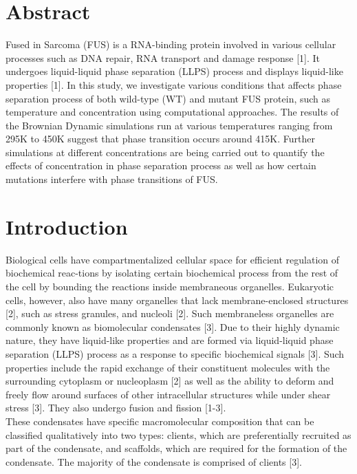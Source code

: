 \documentclass[12ptr]{article}
\begin{document}
\section{Abstract}
Fused in Sarcoma (FUS) is a RNA-binding protein involved in various cellular processes such as DNA repair, RNA transport and damage response [1]. It undergoes liquid-liquid phase separation (LLPS) process and displays liquid-like properties [1]. In this study, we investigate various conditions that affects phase separation process of both wild-type (WT) and mutant FUS protein, such as temperature and concentration using computational approaches. The results of the Brownian Dynamic simulations run at various temperatures ranging from 295K to 450K suggest that phase transition occurs around 415K. Further simulations at different concentrations are being carried out to quantify the effects of concentration in phase separation process as well as how certain mutations interfere with phase transitions of FUS. 

\section{Introduction}

Biological cells have compartmentalized cellular space for efficient regulation of biochemical reac-tions by isolating certain biochemical process from the rest of the cell by bounding the reactions inside membraneous organelles. Eukaryotic cells, however, also have many organelles that lack membrane-enclosed structures [2], such as stress granules, and nucleoli [2]. Such membraneless organelles are commonly known as biomolecular condensates [3]. Due to their highly dynamic nature, they have liquid-like properties and are formed via liquid-liquid phase separation (LLPS) process as a response to specific biochemical signals [3]. Such properties include the rapid exchange of their constituent molecules with the surrounding cytoplasm or nucleoplasm [2] as well as the ability to deform and freely flow around surfaces of other intracellular structures while under shear stress [3]. They also undergo fusion and fission [1-3]. \\

These condensates have specific macromolecular composition that can be classified qualitatively into two types: clients, which are preferentially recruited as part of the condensate, and scaffolds, which are required for the formation of the condensate. The majority of the condensate is comprised of clients [3].\\
\end{document}
